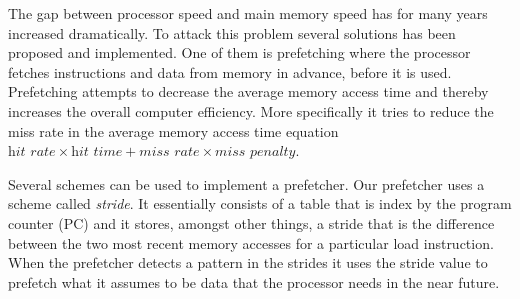 The gap between processor speed and main memory speed has for many years increased
dramatically\cite{mem_cpu_gap}. To
attack this problem several solutions has been proposed and implemented. One of them is prefetching
where the processor fetches instructions and data from memory in advance, before it is used.
Prefetching attempts to decrease the average memory access time and thereby increases the overall
computer efficiency. More specifically it tries to reduce the miss rate in the average memory access
time equation $ \textit{hit rate} \times \textit{hit time} + \textit{miss rate} \times \textit{miss penalty} $.

Several schemes can be used to implement a prefetcher. Our prefetcher uses a scheme called
\emph{stride}. It essentially consists of a table that is index by the program counter (PC) and it
stores, amongst other things, a stride that is the difference between the two most recent memory
accesses for a particular load instruction. When the prefetcher detects a pattern in the strides it
uses the stride value to prefetch what it assumes to be data that the processor needs in the near
future.


